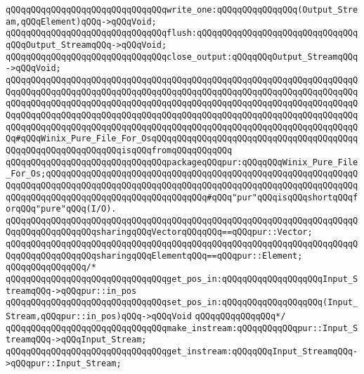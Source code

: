 \verb|qQQqqQQqqQQqqQQqqQQqqQQqqQQqqQQqwrite_one:qQQqqQQqqQQqqQQq(Output_Stream,qQQqElement)qQQq->qQQqVoid;|\newline
\verb|qQQqqQQqqQQqqQQqqQQqqQQqqQQqqQQqflush:qQQqqQQqqQQqqQQqqQQqqQQqqQQqqQQqqQQqOutput_StreamqQQq->qQQqVoid;|\newline
\verb|qQQqqQQqqQQqqQQqqQQqqQQqqQQqqQQqclose_output:qQQqqQQqOutput_StreamqQQq->qQQqVoid;|\newline
\verb|qQQqqQQqqQQqqQQqqQQqqQQqqQQqqQQqqQQqqQQqqQQqqQQqqQQqqQQqqQQqqQQqqQQqqQQqqQQqqQQqqQQqqQQqqQQqqQQqqQQqqQQqqQQqqQQqqQQqqQQqqQQqqQQqqQQqqQQqqQQqqQQqqQQqqQQqqQQqqQQqqQQqqQQqqQQqqQQqqQQqqQQqqQQqqQQqqQQqqQQqqQQqqQQqqQQqqQQqqQQqqQQqqQQqqQQqqQQqqQQqqQQqqQQqqQQqqQQqqQQqqQQqqQQqqQQqqQQqqQQqqQQqqQQqqQQqqQQqqQQqqQQqqQQqqQQqqQQqqQQqqQQqqQQqqQQqqQQqqQQqqQQqqQQqqQQq#qQQqWinix_Pure_File_For_OsqQQqqQQqqQQqqQQqqQQqqQQqqQQqqQQqqQQqqQQqqQQqqQQqqQQqqQQqqQQqqQQqisqQQqfromqQQqqQQqqQQq|\newline
\newline
\verb|qQQqqQQqqQQqqQQqqQQqqQQqqQQqqQQqpackageqQQqpur:qQQqqQQqWinix_Pure_File_For_Os;qQQqqQQqqQQqqQQqqQQqqQQqqQQqqQQqqQQqqQQqqQQqqQQqqQQqqQQqqQQqqQQqqQQqqQQqqQQqqQQqqQQqqQQqqQQqqQQqqQQqqQQqqQQqqQQqqQQqqQQqqQQqqQQqqQQqqQQqqQQqqQQqqQQqqQQqqQQqqQQqqQQqqQQqqQQq#qQQq"pur"qQQqisqQQqshortqQQqforqQQq"pure"qQQq(I/O).|\newline
\verb|qQQqqQQqqQQqqQQqqQQqqQQqqQQqqQQqqQQqqQQqqQQqqQQqqQQqqQQqqQQqqQQqqQQqqQQqqQQqqQQqqQQqqQQqsharingqQQqVectorqQQqqQQq==qQQqpur::Vector;|\newline
\verb|qQQqqQQqqQQqqQQqqQQqqQQqqQQqqQQqqQQqqQQqqQQqqQQqqQQqqQQqqQQqqQQqqQQqqQQqqQQqqQQqqQQqqQQqsharingqQQqElementqQQq==qQQqpur::Element;|\newline
\newline
\verb|qQQqqQQqqQQqqQQq/*|\newline
\verb|qQQqqQQqqQQqqQQqqQQqqQQqqQQqqQQqget_pos_in:qQQqqQQqqQQqqQQqqQQqInput_StreamqQQq->qQQqpur::in_pos|\newline
\verb|qQQqqQQqqQQqqQQqqQQqqQQqqQQqqQQqset_pos_in:qQQqqQQqqQQqqQQqqQQq(Input_Stream,qQQqpur::in_pos)qQQq->qQQqVoid|\newline
\verb|qQQqqQQqqQQqqQQq*/|\newline
\verb|qQQqqQQqqQQqqQQqqQQqqQQqqQQqqQQqmake_instream:qQQqqQQqqQQqpur::Input_StreamqQQq->qQQqInput_Stream;|\newline
\newline
\verb|qQQqqQQqqQQqqQQqqQQqqQQqqQQqqQQqget_instream:qQQqqQQqInput_StreamqQQq->qQQqpur::Input_Stream;|\newline
